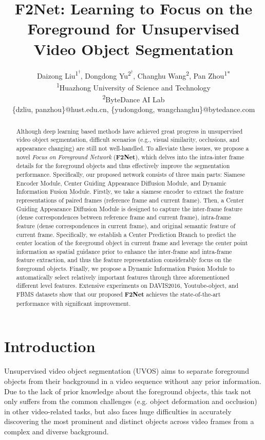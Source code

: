 \documentclass[letterpaper]{article} \usepackage{aaai20}  \usepackage{times}  \usepackage{helvet} \usepackage{courier}  \usepackage[hyphens]{url}  \usepackage{graphicx} \urlstyle{rm} \def\UrlFont{\rm}  \usepackage{graphicx}  \frenchspacing  \setlength{\pdfpagewidth}{8.5in}  \setlength{\pdfpageheight}{11in}  \usepackage{amssymb}
\title{F2Net: Learning to Focus on the Foreground for Unsupervised Video Object Segmentation}
\author{Daizong Liu\textsuperscript{\rm 1$^\dagger$}, Dongdong Yu\textsuperscript{\rm 2$^\dagger$}, Changhu Wang\textsuperscript{\rm 2}, Pan Zhou\textsuperscript{\rm 1*}\\
\textsuperscript{\rm 1}Huazhong University of Science and Technology\\
\textsuperscript{\rm 2}ByteDance AI Lab\\
\{dzliu, panzhou\}@hust.edu.cn, \{yudongdong, wangchanghu\}@bytedance.com
}
\begin{document}
\maketitle
\begin{abstract}
Although deep learning based methods have achieved great progress in unsupervised video object segmentation, difficult scenarios (e.g., visual similarity, occlusions, and appearance changing) are still not well-handled. To alleviate these issues, we propose a novel \textit{Focus on Foreground Network} (\textbf{F2Net}), which delves into the intra-inter frame details for the foreground objects and thus effectively improve the segmentation performance. Specifically, our proposed network consists of three main parts: Siamese Encoder Module, Center Guiding Appearance Diffusion Module, and Dynamic Information Fusion Module. Firstly, we take a siamese encoder to extract the feature representations of paired frames (reference frame and current frame). Then, a Center Guiding Appearance Diffusion Module is designed to capture the inter-frame feature (dense correspondences between reference frame and current frame), intra-frame feature (dense correspondences in current frame), and original semantic feature of current frame. Specifically, we establish a Center Prediction Branch to predict the center location of the foreground object in current frame and leverage the center point information as spatial guidance prior to enhance the inter-frame and intra-frame feature extraction, and thus the feature representation considerably focus on the foreground objects. Finally, we propose a Dynamic Information Fusion Module to automatically select relatively important features through three aforementioned different level features. Extensive experiments on DAVIS2016, Youtube-object, and FBMS datasets show that our proposed \textbf{F2Net} achieves the state-of-the-art performance with significant improvement.
\end{abstract}

\section{Introduction}
Unsupervised video object segmentation (UVOS)
aims to separate foreground objects from their background in a video sequence without any prior information. Due to the lack of prior knowledge about the foreground objects, this task not only suffers from the common challenges (e.g. object deformation and occlusion) in other video-related tasks, but also faces huge difficulties in accurately discovering the most prominent and distinct objects across video frames from a complex and diverse background. 
\end{document}
